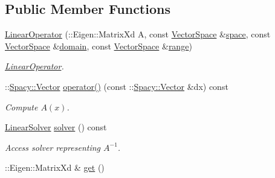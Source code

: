 \subsection*{Public Member Functions}
\begin{DoxyCompactItemize}
\item 
\hyperlink{classSpacy_1_1Rn_1_1LinearOperator_a5766be9cde54684c7318cc0f58fcda4c}{Linear\+Operator} (\+::Eigen\+::\+Matrix\+Xd A, const \hyperlink{classSpacy_1_1VectorSpace}{Vector\+Space} \&\hyperlink{classSpacy_1_1VectorBase_aa999dbf9d679d895dfe04c10fbf9f5e9}{space}, const \hyperlink{classSpacy_1_1VectorSpace}{Vector\+Space} \&\hyperlink{classSpacy_1_1OperatorBase_a2588f9b3e0188820c4c494e63293dc6f}{domain}, const \hyperlink{classSpacy_1_1VectorSpace}{Vector\+Space} \&\hyperlink{classSpacy_1_1OperatorBase_ab19d3b7a6f290b1079248f1e567e53d6}{range})
\begin{DoxyCompactList}\small\item\em \hyperlink{classSpacy_1_1Rn_1_1LinearOperator}{Linear\+Operator}. \end{DoxyCompactList}\item 
\+::\hyperlink{classSpacy_1_1Vector}{Spacy\+::\+Vector} \hyperlink{classSpacy_1_1Rn_1_1LinearOperator_a804fce53cb8c2d1937fd0eae41718039}{operator()} (const \+::\hyperlink{classSpacy_1_1Vector}{Spacy\+::\+Vector} \&dx) const \hypertarget{classSpacy_1_1Rn_1_1LinearOperator_a804fce53cb8c2d1937fd0eae41718039}{}\label{classSpacy_1_1Rn_1_1LinearOperator_a804fce53cb8c2d1937fd0eae41718039}

\begin{DoxyCompactList}\small\item\em Compute $A(x)$. \end{DoxyCompactList}\item 
\hyperlink{classSpacy_1_1Rn_1_1LinearSolver}{Linear\+Solver} \hyperlink{classSpacy_1_1Rn_1_1LinearOperator_a82989d016d28e2ae1fe5fa3d65df783d}{solver} () const \hypertarget{classSpacy_1_1Rn_1_1LinearOperator_a82989d016d28e2ae1fe5fa3d65df783d}{}\label{classSpacy_1_1Rn_1_1LinearOperator_a82989d016d28e2ae1fe5fa3d65df783d}

\begin{DoxyCompactList}\small\item\em Access solver representing $A^{-1}$. \end{DoxyCompactList}\item 
\+::Eigen\+::\+Matrix\+Xd \& \hyperlink{classSpacy_1_1Mixin_1_1Get_aaa3afedcb9b9e943f81d1686b70417db}{get} ()\hypertarget{classSpacy_1_1Mixin_1_1Get_aaa3afedcb9b9e943f81d1686b70417db}{}\label{classSpacy_1_1Mixin_1_1Get_aaa3afedcb9b9e943f81d1686b70417db}


\end{DoxyCompactItemize}
